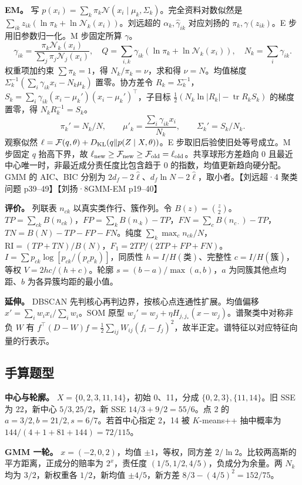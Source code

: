 \documentclass[UTF8,a4paper,zihao=-4,fontset=fandol]{ctexart}
\begin{document}
\textbf{EM。} 写 $p(x_i)=\sum_k\pi_k\mathcal N(x_i\mid\mu_k,\Sigma_k)$。完全资料对数似然是 $\sum_{ik}z_{ik}(\ln\pi_k+\ln\mathcal N_k(x_i))$。刘远超的 $\alpha_k,\widehat\gamma_{ik}$ 对应刘扬的 $\pi_k,\gamma(z_{ik})$。E 步用旧参数归一化。M 步固定所算 $\gamma$。
\[
\gamma_{ik}=\frac{\pi_k\mathcal N_k(x_i)}{\sum_j\pi_j\mathcal N_j(x_i)},\quad
Q=\sum_{i,k}\gamma_{ik}(\ln\pi_k+\ln\mathcal N_k(x_i)),\quad N_k=\sum_i\gamma_{ik}.
\]
权重项加约束 $\sum\pi_k=1$，得 $N_k/\pi_k=\nu$，求和得 $\nu=N$。均值梯度 $\Sigma_k^{-1}(\sum_i\gamma_{ik}x_i-N_k\mu_k)$ 置零。协方差令 $R_k=\Sigma_k^{-1}$，$S_k=\sum_i\gamma_{ik}(x_i-\mu_k')(x_i-\mu_k')^\top$，子目标 $\tfrac12(N_k\ln|R_k|-\operatorname{tr}R_kS_k)$ 的梯度置零，得 $N_k R_k^{-1}=S_k$。
\[
\pi_k'=N_k/N,\qquad\mu'_k=\frac{\sum_i\gamma_{ik}x_i}{N_k},\qquad\Sigma_k'=S_k/N_k.
\]
观察似然 $\ell=\mathcal F(q,\theta)+D_{\rm KL}(q\|p(Z\mid X,\theta))$。E 步取旧后验使旧处等号成立。M 步固定 $q$ 抬高下界，故 $\ell_{\rm new}\ge\mathcal F_{\rm new}\ge\mathcal F_{\rm old}=\ell_{\rm old}$。共享球形方差趋向 0 且最近中心唯一时，非最近成分责任度比包含趋于 0 的指数，均值更新趋向硬分配。GMM 的 AIC、BIC 分别为 $2d_f-2\hat\ell$、$d_f\ln N-2\hat\ell$，取小者。【刘远超·4 聚类问题 p39–49】【刘扬·8GMM-EM p19–40】

\textbf{评价。} 列联表 $n_{ck}$ 以真实类作行、簇作列。令 $B(z)=\binom z2$。$TP=\sum_{ck}B(n_{ck})$，$FP=\sum_k B(n_{\cdot k})-TP$，$FN=\sum_c B(n_{c\cdot})-TP$，$TN=B(N)-TP-FP-FN$。纯度 $\sum_k\max_c n_{ck}/N$，$\mathrm{RI}=(TP+TN)/B(N)$，$F_1=2TP/(2TP+FP+FN)$。$I=\sum p_{ck}\log[p_{ck}/(p_cp_k)]$，同质性 $h=I/H(\text{类})$、完整性 $c=I/H(\text{簇})$，等权 $V=2hc/(h+c)$。轮廓 $s=(b-a)/\max(a,b)$，$a$ 为同簇其他点均距、$b$ 为各异簇均距的最小值。

\textbf{延伸。} DBSCAN 先判核心再判边界，按核心点连通性扩展。均值偏移 $x'\!=\sum_iw_ix_i/\sum_iw_i$。SOM 原型 $w_j'\!=w_j+\eta H_{j,j_*}(x-w_j)$。谱聚类中对称非负 $W$ 有 $f^\top(D-W)f=\tfrac12\sum_{ij}W_{ij}(f_i-f_j)^2$，故半正定。谱特征以对应特征向量的行表示。

\subsection{手算题型}
\textbf{中心与轮廓。} $X=\{0,2,3,11,14\}$，初始 0、11，分成 $\{0,2,3\},\{11,14\}$。旧 SSE 为 22，新中心 $5/3,25/2$，新 SSE $14/3+9/2=55/6$。点 2 的 $a=3/2,b=21/2,s=6/7$。若首中心指定 2，14 被 $K$-means++ 抽中概率为 $144/(4+1+81+144)=72/115$。

\textbf{GMM 一轮。} $x=(-2,0,2)$，均值 $\pm1$，等权，同方差 $2/\ln2$。比较两高斯的平方距离，正成分的赔率为 $2^x$，责任度 $(1/5,1/2,4/5)$，负成分为余量。两 $N_k$ 均为 $3/2$，新权重各 $1/2$，新均值 $\pm4/5$，新方差 $8/3-(4/5)^2=152/75$。
\end{document}
